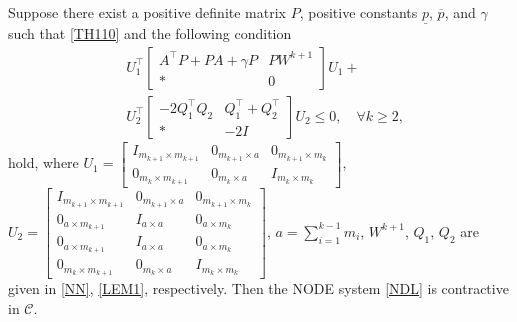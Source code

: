 \documentclass[10pt,a4paper]{amsart}
\newcommand{\bbm}[1]{\left[\begin{matrix} #1 \end{matrix}\right]}
\begin{document}
\begin{theorem}\label{theorem1}
Suppose there exist a positive definite matrix $P$, positive constants $\underline{p}$, $\overline{p}$, and $\gamma$ such that \eqref{TH110} and the following condition 
\begin{equation}\label{TH12}
\begin{aligned}
&U_1^\top
\begin{bmatrix}
     A^\top P+PA+\gamma P &PW^{k+1}\\
  \ast& 0
\end{bmatrix}U_1+\\&U_2^\top\begin{bmatrix}
 -2Q_1^\top Q_2&Q_1^\top+Q_2^\top
 \\
\ast&-2I
\end{bmatrix}U_2\leq 0, \quad\forall k\geq 2,
\end{aligned}
\end{equation}
hold, where $U_1=\bbm{I_{m_{k+1}\times m_{k+1}} &0_{m_{k+1}\times a}&0_{m_{k+1}\times m_{k}}\\0_{m_{k}\times m_{k+1}}&0_{m_{k}\times a}&I_{m_{k}\times m_{k}}}$, $U_2=\bbm{I_{m_{k+1}\times m_{k+1}} &0_{m_{k+1}\times a}&0_{m_{k+1}\times m_{k}}\\0_{a\times m_{k+1}}&I_{a\times a}&0_{a\times m_{k}}\\0_{a\times m_{k+1}}&I_{a\times a}&0_{a\times m_{k}}\\0_{m_{k}\times m_{k+1}}&0_{m_{k}\times a}&I_{m_{k}\times m_{k}}}$, $a=\sum_{i=1}^{k-1}m_i$, $W^{k+1}$, $Q_1$, $Q_2$ are given in \eqref{NN}, \eqref{LEM1}, respectively. Then the NODE system \eqref{NDL} is contractive in $\mathcal{C}$.
\end{theorem}
\end{document}
